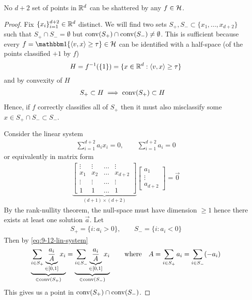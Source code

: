 \begin{proposition}\label{prop:vc-dim-half-spaces}
    No $d+2$ set of points in $\mathbb{R}^d$ can be shattered by any $f \in \mathcal{H}$.
\end{proposition}

\begin{proof}
    Fix $\{x_i\}_{i=1}^{d+2} \in \mathbb{R}^d$ distinct.
    We will find two sets $S_+, S_- \subset \{x_1, \ldots, x_{d+2}\}$ such
    that $S_+ \cap S_- = \emptyset$ but $\operatorname{conv}(S_+) \cap \operatorname{conv}(S_-) \neq \emptyset$.
    This is sufficient because every $f = \ind\{\braket{v,x} \geq \tau\} \in \cH$
    can be identified with a half-space (of the points classified $+1$ by $f$)
    \begin{align}
        H = f^{-1}(\{1\}) = \{ x \in \mathbb{R}^d : \braket{v,x} \geq \tau \}
    \end{align}
    and by convexity of $H$
    \begin{align}
        S_+ \subset H &\implies \operatorname{conv}(S_+) \subset H
    \end{align}
    Hence, if $f$ correctly classifies all of $S_+$ then it must also
    misclassify some $x \in S_+ \cap S_- \subset S_-$.

    Consider the linear system
    \begin{align}
        \sum_{i=1}^{d+2} a_i x_i = 0, \qquad \sum_{i=1}^{d+2} a_i = 0
        \label{eq:9-12-lin-system}
    \end{align}
    or equivalently in matrix form
    \begin{align}
        \underbrace{\begin{bmatrix}
            \vdots & \vdots & \hdots & \vdots \\
            x_1 & x_2 & \hdots & x_{d+2} \\
            \vdots & \vdots & \hdots & \vdots \\
            1 & 1 & \hdots & 1
        \end{bmatrix}}_{(d+1) \times (d+2)} \begin{bmatrix}
            a_1 \\ \vdots \\ a_{d+2}
        \end{bmatrix} = \vec{0}
    \end{align}
    By the rank-nullity theorem, the null-space must have dimension $\geq 1$
    hence there exists at least one solution $\vec{a}$.
    Let
    \begin{align}
        S_+ = \{ i : a_i > 0 \}, \qquad S_- = \{ i : a_i < 0 \}
    \end{align}
    Then by \cref{eq:9-12-lin-system}
    \begin{align}
        \underbrace{\sum_{i \in S_+} \underbrace{\frac{a_i}{A}}_{\in [0,1]} x_i}_{\in \operatorname{conv}(S_+)}
        = \underbrace{\sum_{i \in S_-} \underbrace{\frac{a_i}{A}}_{\in [0,1]} x_i }_{\in \operatorname{conv}(S_-)}
        \qquad \text{where} \quad A = \sum_{i \in S_+} a_i = \sum_{i \in S_-} (-a_i)
    \end{align}
    This gives us a point in $\operatorname{conv}(S_+) \cap \operatorname{conv}(S_-)$.
\end{proof}

